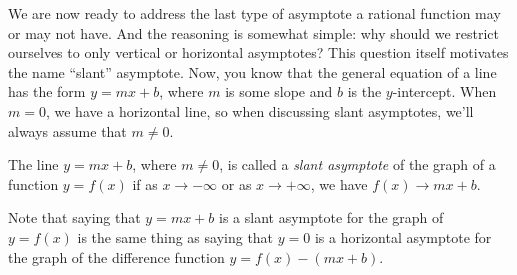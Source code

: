 \documentclass{ximera}
\begin{document}
We are now ready to address the last type of asymptote a rational function may or may not have. And the reasoning is somewhat simple: why should we restrict ourselves to only vertical or horizontal asymptotes? This question itself motivates the name ``slant'' asymptote. Now, you know that the general equation of a line has the form $y=mx+b$, where $m$ is some slope and $b$ is the $y$-intercept. When $m=0$, we have a horizontal line, so when discussing slant asymptotes, we'll always assume that $m \neq 0$.


\begin{definition}
  The line $y=mx+b$, where $m\neq 0$, is called a \emph{slant asymptote} of the graph of a function $y=f(x)$ if as $x \to -\infty$ or as $x\to +\infty$, we have $f(x) \to mx+b$.
\end{definition}

Note that saying that $y=mx+b$ is a slant asymptote for the graph of $y=f(x)$ is the same thing as saying that $y=0$ is a horizontal asymptote for the graph of the difference function $y=f(x)-(mx+b)$.
\end{document}
